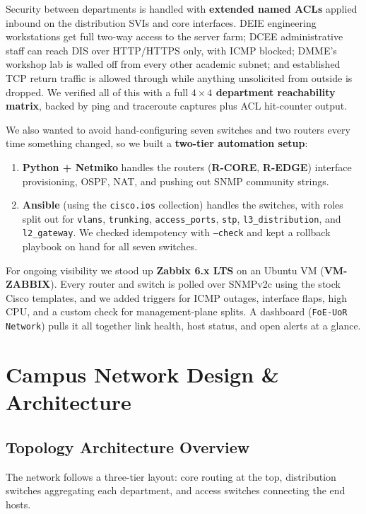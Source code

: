 \documentclass[11pt,a4paper]{article}
\newcommand{\hr}{\vspace{0.2cm}\noindent\hrulefill\vspace{0.2cm}}
\begin{document}
Security between departments is handled with \textbf{extended named ACLs} applied inbound on the distribution SVIs and core interfaces. DEIE engineering workstations get full two-way access to the server farm; DCEE administrative staff can reach DIS over HTTP/HTTPS only, with ICMP blocked; DMME's workshop lab is walled off from every other academic subnet; and established TCP return traffic is allowed through while anything unsolicited from outside is dropped. We verified all of this with a full \textbf{\texorpdfstring{$4 \times 4$}{4x4} department reachability matrix}, backed by ping and traceroute captures plus ACL hit-counter output.

We also wanted to avoid hand-configuring seven switches and two routers every time something changed, so we built a \textbf{two-tier automation setup}:
\begin{enumerate}
    \item \textbf{Python + Netmiko} handles the routers (\textbf{R-CORE}, \textbf{R-EDGE}) interface provisioning, OSPF, NAT, and pushing out SNMP community strings.
    \item \textbf{Ansible} (using the \texttt{cisco.ios} collection) handles the switches, with roles split out for \texttt{vlans}, \texttt{trunking}, \texttt{access\_ports}, \texttt{stp}, \texttt{l3\_distribution}, and \texttt{l2\_gateway}. We checked idempotency with \texttt{--check} and kept a rollback playbook on hand for all seven switches.
\end{enumerate}

For ongoing visibility we stood up \textbf{Zabbix 6.x LTS} on an Ubuntu VM (\textbf{VM-ZABBIX}). Every router and switch is polled over SNMPv2c using the stock Cisco templates, and we added triggers for ICMP outages, interface flaps, high CPU, and a custom check for management-plane splits. A dashboard (\texttt{FoE-UoR Network}) pulls it all together link health, host status, and open alerts at a glance.

\hr

\section{Campus Network Design \& Architecture}

\subsection{Topology Architecture Overview}

The network follows a three-tier layout: core routing at the top, distribution switches aggregating each department, and access switches connecting the end hosts.
\end{document}
